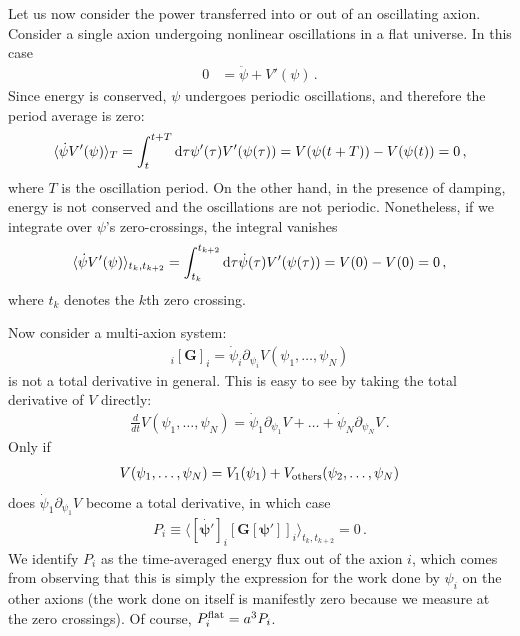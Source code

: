 \documentclass[11pt]{article}
\begin{document}
Let us now consider the power transferred into or out of an oscillating axion. Consider a single axion undergoing nonlinear oscillations in a flat universe. In this case
\begin{align}\label{eqn:single_axion}
    0&=\ddot\psi + V'(\psi)\,.
\end{align}
Since energy is conserved, $\psi$ undergoes periodic oscillations, and therefore the period average is zero:
\begin{align}
    \langle\dot\psi V'(\psi)\rangle_T = \int_t^{t + T}{\rm d}\tau \psi'(\tau)V'(\psi(\tau)) = V(\psi(t + T)) - V(\psi(t)) = 0\,,
\end{align}
where $T$ is the oscillation period.
On the other hand, in the presence of damping, energy is not conserved and the oscillations are not periodic. Nonetheless, if we integrate over $\psi$'s zero-crossings, the integral vanishes
\begin{align}
    \langle\dot\psi V'(\psi)\rangle_{t_k,t_{{k + 2}}} = \int_{t_k}^{t_{k + 2}}{\rm d}\tau \dot\psi(\tau) V'(\psi(\tau)) = V(0) - V(0) = 0\,,
\end{align}
where $t_k$ denotes the $k$th zero crossing.

Now consider a multi-axion system:
\begin{align}
    [\dot{\bm\psi}]_i[\bm G]_i = \dot \psi_i\partial_{\psi_i}V(\psi_1,\dots,\psi_N)
\end{align}
is not a total derivative in general. This is easy to see by taking the total derivative of $V$ directly:
\begin{align}
    \frac{d}{dt}V(\psi_1,\dots,\psi_N) = \dot\psi_1\partial_{\psi_1}V + \dots+\dot\psi_N\partial_{\psi_N}V\,.
\end{align}
Only if
\begin{align}
    V(\psi_1,\dots,\psi_N) = V_1(\psi_1) + V_{\rm others}(\psi_2,\dots,\psi_N)
\end{align}
does $\dot\psi_1\partial_{\psi_1}V$ become a total derivative, in which case
\begin{align}
    P_i\equiv \langle[\dot{\bm \psi'}]_i [\bm G[\bm\psi']]_i\rangle_{t_k,t_{k + 2}} = 0\,.
\end{align}
We identify $P_i$ as the time-averaged energy flux out of the axion $i$, which comes from observing that this is simply the expression for the work done by $\psi_i$ on the other axions (the work done on itself is manifestly zero because we measure at the zero crossings). Of course, $P_i^{\rm flat} = a^3 P_i$.
\end{document}
